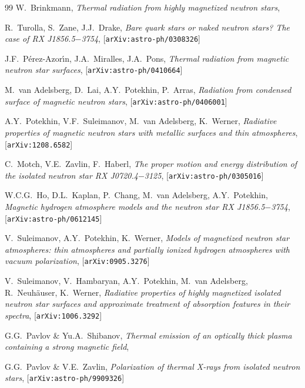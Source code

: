 \documentclass{pos1}
\begin{document}
\begin{thebibliography}{99}
W.~Brinkmann,
\textit{Thermal radiation from highly magnetized neutron stars},

R.~Turolla, S.~Zane, J.J.~Drake,
\textit{Bare quark stars or naked neutron stars? The case of RX J1856.5$-$3754},
[\texttt{arXiv:astro-ph/0308326}]

J.F.~P\'erez-Azor\'{\i}n, J.A.~Miralles, J.A.~Pons,
\textit{Thermal radiation from magnetic neutron star surfaces},
[\texttt{arXiv:astro-ph/0410664}]

M.~van Adelsberg, D.~Lai, A.Y.~Potekhin, P.~Arras,
\textit{Radiation from condensed surface of magnetic neutron stars},
[\texttt{arXiv:astro-ph/0406001}]

A.Y.~Potekhin, V.F.~Suleimanov, M.~van Adelsberg, K.~Werner,
\textit{Radiative properties of magnetic neutron stars with metallic surfaces and thin atmospheres},
[\texttt{arXiv:1208.6582}]

C.~Motch, V.E.~Zavlin, F.~Haberl,
\textit{The proper motion and energy distribution of the isolated neutron star RX J0720.4$-$3125},
[\texttt{arXiv:astro-ph/0305016}]

W.C.G.~Ho, D.L.~Kaplan, P.~Chang, M.~van Adelsberg, A.Y.~Potekhin,
\textit{Magnetic hydrogen atmosphere models and the neutron star RX J1856.5$-$3754},
[\texttt{arXiv:astro-ph/0612145}]

V.~Suleimanov, A.Y.~Potekhin, K.~Werner,
\textit{Models of magnetized neutron star atmospheres: thin atmospheres and partially ionized hydrogen atmospheres with vacuum polarization},
[\texttt{arXiv:0905.3276}]

V.~Suleimanov, V.~Hambaryan, A.Y.~Potekhin, M.~van Adelsberg, R.~Neuh\"auser, K.~Werner,
\textit{Radiative properties of highly magnetized isolated neutron star surfaces and approximate treatment of absorption features in their spectra},
[\texttt{arXiv:1006.3292}]

G.G.~Pavlov \& Yu.A.~Shibanov,
\textit{Thermal emission of an optically thick plasma containing a strong magnetic field},

G.G.~Pavlov \& V.E.~Zavlin,
\textit{Polarization of thermal X-rays from isolated neutron stars},
[\texttt{arXiv:astro-ph/9909326}]


\end{thebibliography}
\end{document}
